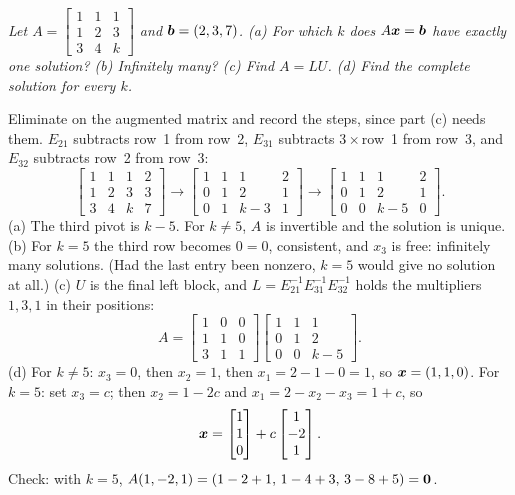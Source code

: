 \begin{example}\label{ex:u14-k}
\emph{Let $A=\begin{bmatrix}1&1&1\\1&2&3\\3&4&k\end{bmatrix}$ and $\boldsymbol{b}=(2,3,7)$. (a) For which $k$
does $A\boldsymbol{x}=\boldsymbol{b}$ have exactly one solution? (b) Infinitely many? (c) Find $A=LU$. (d) Find the
complete solution for every $k$.}

Eliminate on the augmented matrix and record the steps, since part (c) needs them. $E_{21}$ subtracts
row~1 from row~2, $E_{31}$ subtracts $3\times$row~1 from row~3, and $E_{32}$ subtracts row~2 from
row~3:
\[
\left[\begin{array}{ccc|c}1&1&1&2\\1&2&3&3\\3&4&k&7\end{array}\right]\to
\left[\begin{array}{ccc|c}1&1&1&2\\0&1&2&1\\0&1&k-3&1\end{array}\right]\to
\left[\begin{array}{ccc|c}1&1&1&2\\0&1&2&1\\0&0&k-5&0\end{array}\right].
\]
(a) The third pivot is $k-5$. For $k\ne5$, $A$ is invertible and the solution is unique.
(b) For $k=5$ the third row becomes $0=0$, consistent, and $x_3$ is free: infinitely many solutions.
(Had the last entry been nonzero, $k=5$ would give no solution at all.)
(c) $U$ is the final left block, and $L=E_{21}^{-1}E_{31}^{-1}E_{32}^{-1}$ holds the multipliers
$1,3,1$ in their positions:
\[
A=\begin{bmatrix}1&0&0\\1&1&0\\3&1&1\end{bmatrix}\begin{bmatrix}1&1&1\\0&1&2\\0&0&k-5\end{bmatrix}.
\]
(d) For $k\ne5$: $x_3=0$, then $x_2=1$, then $x_1=2-1-0=1$, so $\boldsymbol{x}=(1,1,0)$. For $k=5$: set
$x_3=c$; then $x_2=1-2c$ and $x_1=2-x_2-x_3=1+c$, so
\[
\boldsymbol{x}=\begin{bmatrix}1\\1\\0\end{bmatrix}+c\begin{bmatrix}1\\-2\\1\end{bmatrix}.
\]
Check: with $k=5$, $A(1,-2,1)=(1-2+1,\,1-4+3,\,3-8+5)=\boldsymbol{0}$.
\end{example}

